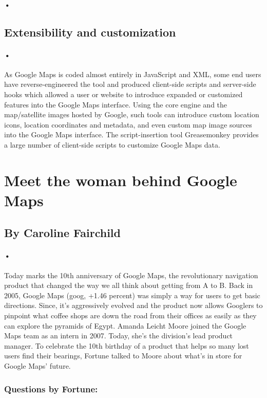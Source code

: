 \documentclass[7pt]{article}
\begin{document}
\paragraph{•}
\subsection*{Extensibility and customization}
\paragraph{•}
As Google Maps is coded almost entirely in JavaScript and XML, some end users have reverse-engineered the tool and produced client-side scripts and server-side hooks which allowed a user or website to introduce expanded or customized features into the Google Maps interface. Using the core engine and the map/satellite images hosted by Google, such tools can introduce custom location icons, location coordinates and metadata, and even custom map image sources into the Google Maps interface. The script-insertion tool Greasemonkey provides a large number of client-side scripts to customize Google Maps data.
\section*{Meet the woman behind Google Maps}
\subsection*{By Caroline Fairchild}
\paragraph{•}
Today marks the 10th anniversary of Google Maps, the revolutionary navigation product that changed the way we all think about getting from A to B.
Back in 2005, Google Maps (goog, +1.46 percent) was simply a way for users to get basic directions. Since, it’s aggressively evolved and the product now allows Googlers to pinpoint what coffee shops are down the road from their offices as easily as they can explore the pyramids of Egypt. Amanda Leicht Moore joined the Google Maps team as an intern in 2007. Today, she’s the division’s lead product manager. To celebrate the 10th birthday of a product that helps so many lost users find their bearings, Fortune talked to Moore about what’s in store for Google Maps’ future.\cite{Caroline}
\subsubsection*{Questions by Fortune:}
\end{document}

